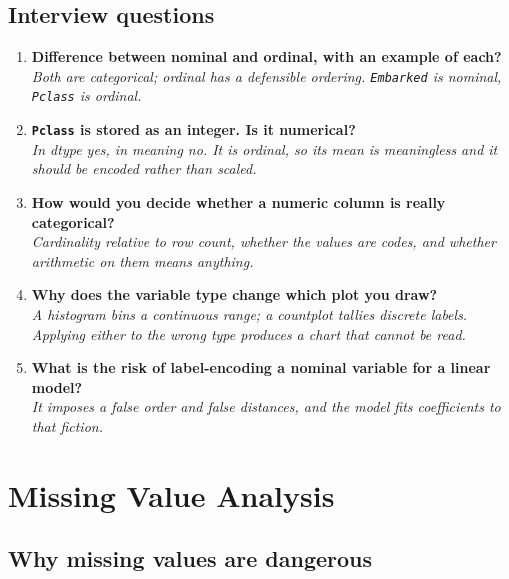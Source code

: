 \documentclass[11pt,a4paper]{article}
\begin{document}
\subsection*{Interview questions}

\begin{enumerate}\itemsep4pt
  \item \textbf{Difference between nominal and ordinal, with an example of each?}\\
        \emph{Both are categorical; ordinal has a defensible ordering. \texttt{Embarked} is
        nominal, \texttt{Pclass} is ordinal.}
  \item \textbf{\texttt{Pclass} is stored as an integer. Is it numerical?}\\
        \emph{In dtype yes, in meaning no. It is ordinal, so its mean is meaningless and it
        should be encoded rather than scaled.}
  \item \textbf{How would you decide whether a numeric column is really categorical?}\\
        \emph{Cardinality relative to row count, whether the values are codes, and whether
        arithmetic on them means anything.}
  \item \textbf{Why does the variable type change which plot you draw?}\\
        \emph{A histogram bins a continuous range; a countplot tallies discrete labels.
        Applying either to the wrong type produces a chart that cannot be read.}
  \item \textbf{What is the risk of label-encoding a nominal variable for a linear model?}\\
        \emph{It imposes a false order and false distances, and the model fits coefficients
        to that fiction.}
\end{enumerate}

\newpage
\section{Missing Value Analysis}


\subsection{Why missing values are dangerous}
\end{document}
